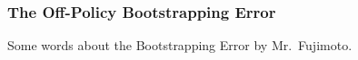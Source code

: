 \subsubsection{The Off-Policy Bootstrapping Error}\label{sec:BE}
Some words about the Bootstrapping Error by Mr.\ Fujimoto.